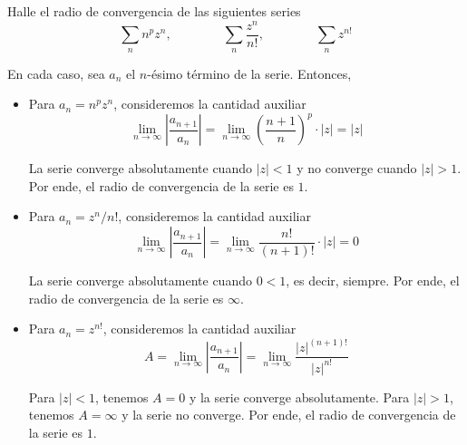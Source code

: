 \begin{exercise}
Halle el radio de convergencia de las siguientes series
$$\sum_n n^p z^n, \qquad \qquad \sum_n \frac {z^n} {n!}, \qquad \qquad \sum_n z^{n!}$$
\end{exercise}

\begin{solution}
En cada caso, sea $a_n$ el $n$-ésimo término de la serie. Entonces,
\begin{itemize}
    \item Para $a_n = n^p z^n$, consideremos la cantidad auxiliar
    $$
    \lim_{n \to \infty} \left| \frac {a_{n+1}} {a_n} \right|
        = \lim_{n \to \infty} \left( \frac {n+1} n \right)^p \cdot |z|
        = |z|
    $$
    
    La serie converge absolutamente cuando $|z| < 1$ y no converge cuando $|z| > 1$. Por ende, el radio de convergencia de la serie es $1$.
    
    \item Para $a_n = z^n / n!$, consideremos la cantidad auxiliar
    $$
    \lim_{n \to \infty} \left| \frac {a_{n+1}} {a_n} \right|
        = \lim_{n \to \infty} \frac {n!} {(n+1)!} \cdot |z|
        = 0
    $$
    
    La serie converge absolutamente cuando $0 < 1$, es decir, siempre. Por ende, el radio de convergencia de la serie es $\infty$.
    
    \item Para $a_n = z^{n!}$, consideremos la cantidad auxiliar
    $$
    A
        = \lim_{n \to \infty} \left| \frac {a_{n+1}} {a_n} \right|
        = \lim_{n \to \infty} \frac {|z|^{(n+1)!}} {|z|^{n!}}
    $$
    
    Para $|z| < 1$, tenemos $A = 0$ y la serie converge absolutamente. Para $|z| > 1$, tenemos $A = \infty$ y la serie no converge. Por ende, el radio de convergencia de la serie es $1$.
\end{itemize}
\end{solution}
